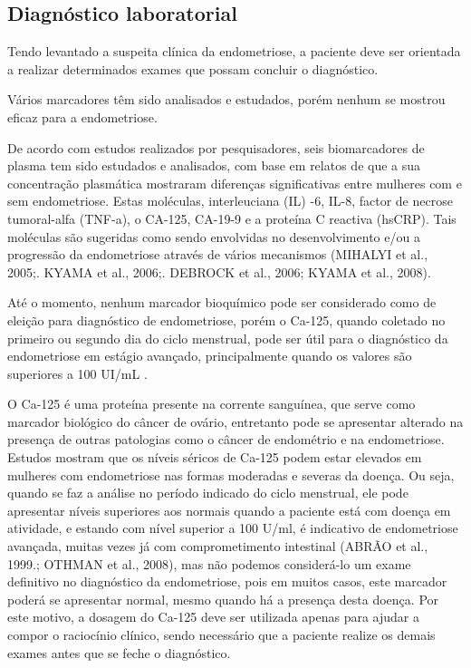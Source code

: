\documentclass[12pt]{article} %
\begin{document}
\subsection{Diagnóstico laboratorial}

Tendo levantado a suspeita clínica da endometriose, a paciente deve ser orientada a realizar determinados exames que possam concluir o diagnóstico.

Vários marcadores têm sido analisados e estudados, porém nenhum se mostrou eficaz para a endometriose.

De acordo com estudos realizados por pesquisadores, seis biomarcadores de plasma tem sido estudados e analisados, com base em relatos  de que a sua concentração plasmática mostraram diferenças significativas entre mulheres com e sem endometriose. Estas moléculas, interleuciana (IL) -6, IL-8, factor de necrose tumoral-alfa (TNF-a), o CA-125, CA-19-9 e a proteína C reactiva (hsCRP). Tais moléculas são sugeridas como sendo envolvidas no desenvolvimento e/ou a progressão da endometriose através de vários mecanismos (MIHALYI et al., 2005;. KYAMA et al., 2006;. DEBROCK et al., 2006; KYAMA et al., 2008).

Até o momento, nenhum marcador
bioquímico pode ser considerado como de eleição para
diagnóstico de endometriose, porém o Ca-125, quando
coletado no primeiro ou segundo dia do ciclo menstrual, pode ser útil para o diagnóstico da endometriose em
estágio avançado, principalmente quando os valores são
superiores a 100 UI/mL .

O Ca-125 é uma proteína presente na corrente sanguínea, que serve como
marcador biológico do câncer de ovário, entretanto pode se apresentar alterado na presença de outras patologias como o câncer de endométrio e na endometriose. Estudos mostram que os níveis séricos de Ca-125 podem estar elevados em mulheres com endometriose nas formas moderadas e severas da doença. Ou seja, quando se faz a análise no período indicado do ciclo menstrual, ele pode apresentar níveis superiores aos normais quando a paciente está com doença em atividade, e estando com nível superior a 100 U/ml, é indicativo de endometriose avançada, muitas vezes já com comprometimento intestinal (ABRÃO et al., 1999.; OTHMAN et al., 2008), mas não podemos considerá-lo um exame definitivo no diagnóstico da endometriose, pois em muitos casos, este marcador poderá se apresentar normal, mesmo quando há a presença desta doença. Por este motivo, a dosagem do Ca-125 deve ser utilizada apenas para ajudar a compor o raciocínio clínico, sendo necessário que a paciente realize os demais exames antes que se feche o diagnóstico.
\end{document}
